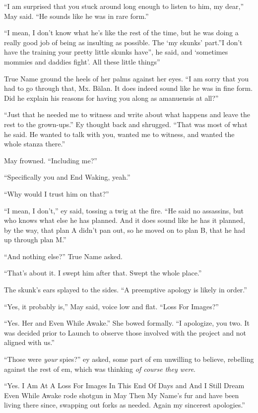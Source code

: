 ``I am surprised that you stuck around long enough to listen to him, my dear,'' May said. ``He sounds like he was in rare form.''

``I mean, I don't know what he's like the rest of the time, but he was doing a really good job of being as insulting as possible. The `my skunks' part.''I don't have the training your pretty little skunks have'', he said, and `sometimes mommies and daddies fight'. All these little things''

True Name ground the heels of her palms against her eyes. ``I am sorry that you had to go through that, Mx. Bălan. It does indeed sound like he was in fine form. Did he explain his reasons for having you along as amanuensis at all?''

``Just that he needed me to witness and write about what happens and leave the rest to the grown-ups.'' Ey thought back and shrugged. ``That was most of what he said. He wanted to talk with you, wanted me to witness, and wanted the whole stanza there.''

May frowned. ``Including me?''

``Specifically you and End Waking, yeah.''

``Why would I trust him on that?''

``I mean, I don't,'' ey said, tossing a twig at the fire. ``He said no assassins, but who knows what else he has planned. And it does sound like he has it planned, by the way, that plan A didn't pan out, so he moved on to plan B, that he had up through plan M.''

``And nothing else?'' True Name asked.

``That's about it. I swept him after that. Swept the whole place.''

The skunk's ears splayed to the sides. ``A preemptive apology is likely in order.''

``Yes, it probably is,'' May said, voice low and flat. ``Loss For Images?''

``Yes. Her and Even While Awake.'' She bowed formally. ``I apologize, you two. It was decided prior to Launch to observe those involved with the project and not aligned with us.''

``Those were \emph{your} spies?'' ey asked, some part of em unwilling to believe, rebelling against the rest of em, which was thinking \emph{of course they were}.

``Yes. I Am At A Loss For Images In This End Of Days and And I Still Dream Even While Awake rode shotgun in May Then My Name's fur and have been living there since, swapping out forks as needed. Again my sincerest apologies.''

